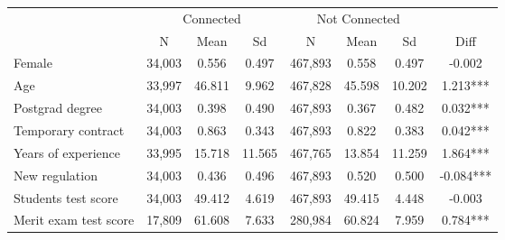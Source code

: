 \begin{tabular}{lccccccc}
\hline  & \multicolumn{3}{c}{Connected} & \multicolumn{3}{c}{Not Connected} & \\
 & N & Mean & Sd & N & Mean & Sd & Diff\\
\hline Female & 34,003 & 0.556 & 0.497 & 467,893 & 0.558 & 0.497 & -0.002\\
Age & 33,997 & 46.811 & 9.962 & 467,828 & 45.598 & 10.202 & 1.213***\\
Postgrad degree & 34,003 & 0.398 & 0.490 & 467,893 & 0.367 & 0.482 & 0.032***\\
Temporary contract & 34,003 & 0.863 & 0.343 & 467,893 & 0.822 & 0.383 & 0.042***\\
Years of experience & 33,995 & 15.718 & 11.565 & 467,765 & 13.854 & 11.259 & 1.864***\\
New regulation & 34,003 & 0.436 & 0.496 & 467,893 & 0.520 & 0.500 & -0.084***\\
Students test score & 34,003 & 49.412 & 4.619 & 467,893 & 49.415 & 4.448 & -0.003\\
Merit exam test score & 17,809 & 61.608 & 7.633 & 280,984 & 60.824 & 7.959 & 0.784***\\
\hline\end{tabular}\\
\hfil\\
